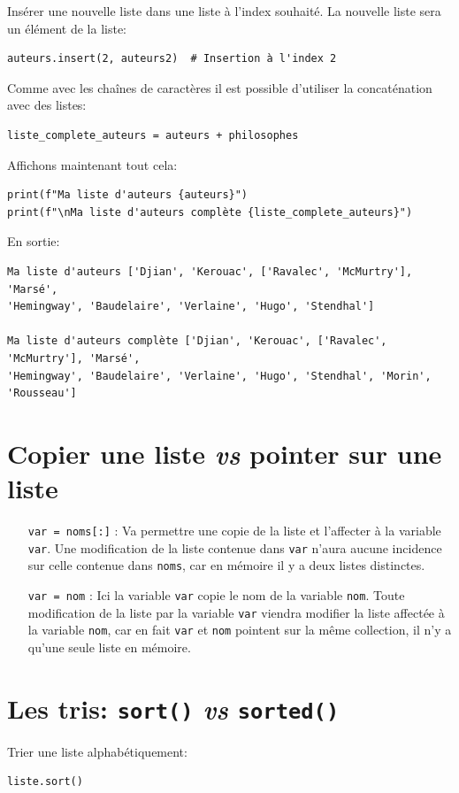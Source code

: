 \documentclass[a4paper,11pt]{book}
\begin{document}
Insérer une nouvelle liste dans une liste à l'index souhaité. La nouvelle liste sera un élément de la liste:
\begin{lstlisting}
auteurs.insert(2, auteurs2)  # Insertion à l'index 2
\end{lstlisting}

Comme avec les chaînes de caractères il est possible d'utiliser la concaténation avec des listes:
\begin{lstlisting}
liste_complete_auteurs = auteurs + philosophes 
\end{lstlisting}
\medskip

Affichons maintenant tout cela:
\begin{lstlisting}
print(f"Ma liste d'auteurs {auteurs}")
print(f"\nMa liste d'auteurs complète {liste_complete_auteurs}")
\end{lstlisting}
\medskip

En sortie:
\begin{verbatim}
Ma liste d'auteurs ['Djian', 'Kerouac', ['Ravalec', 'McMurtry'], 'Marsé', 
'Hemingway', 'Baudelaire', 'Verlaine', 'Hugo', 'Stendhal']

Ma liste d'auteurs complète ['Djian', 'Kerouac', ['Ravalec', 'McMurtry'], 'Marsé', 
'Hemingway', 'Baudelaire', 'Verlaine', 'Hugo', 'Stendhal', 'Morin', 'Rousseau']
\end{verbatim}
\medskip

\section{Copier une liste \textit{vs} pointer sur une liste}
\begin{itemize}
	\item[\texttt{var = noms[:]}]: Va permettre une copie de la liste et l'affecter à la variable \texttt{var}. Une modification de la liste contenue dans \texttt{var} n'aura aucune incidence sur celle contenue dans \texttt{noms}, car en mémoire il y a deux listes distinctes.
	\item[\texttt{var = nom}]: Ici la variable \texttt{var} copie le nom de la variable \texttt{nom}. Toute modification de la liste par la variable \texttt{var} viendra modifier la liste affectée à la variable \texttt{nom}, car en fait \texttt{var} et \texttt{nom} pointent sur la même collection, il n'y a qu'une seule liste en mémoire.
\end{itemize}
\medskip

\section{Les tris: \texttt{sort()} \textit{vs} \texttt{sorted()}}
Trier une liste alphabétiquement:
\begin{lstlisting}
liste.sort()
\end{lstlisting}
\medskip
\end{document}
